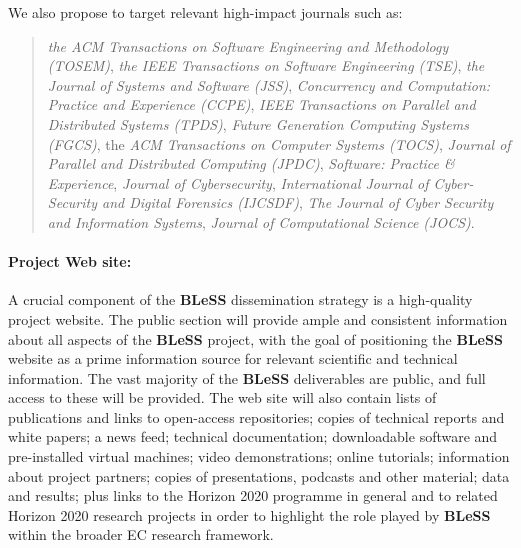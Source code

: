 \documentclass[a4paper,11pt]{article}
\newcommand{\project}[1]{\textbf{#1}\xspace}
\newcommand{\BLESS}{\project{BLeSS}}
\newcommand{\TheProject}{\BLESS}
\begin{document}
\noindent
We also propose to target relevant high-impact journals such as:
\begin{quote}
\emph{the ACM Transactions on Software Engineering and Methodology (TOSEM)}, 
\emph{the IEEE Transactions on Software Engineering (TSE)}, 
\emph{the Journal of Systems and Software (JSS)},
\emph{Concurrency and Computation: Practice and Experience (CCPE)},
\emph{IEEE Transactions on Parallel and Distributed Systems (TPDS)},
\emph{Future Generation Computing Systems (FGCS)},
the \emph{ACM Transactions on Computer Systems (TOCS)},
\emph{Journal of Parallel and Distributed Computing (JPDC)},
\emph{Software: Practice \& Experience}, 
\emph{Journal of Cybersecurity},
\emph{International Journal of Cyber-Security and Digital Forensics (IJCSDF)},
\emph{The Journal of Cyber Security and Information Systems},
\emph{Journal of Computational Science (JOCS)}.
\end{quote}

\paragraph{Project Web site:}  
A crucial component of the \TheProject{} dissemination strategy is a
high-quality project website. The public section will provide ample
and consistent information about all aspects of the \TheProject{}
project, with the goal of positioning the \TheProject{} website as a
prime information source for relevant scientific and technical
information.  The vast majority of the \TheProject{} deliverables are
public, and full access to these will be provided.  The web site will also contain lists of publications and links
to open-access repositories; copies of technical reports and white
papers; a news feed; technical documentation; downloadable software
and pre-installed virtual machines; video demonstrations; online
tutorials; information about project partners; copies of
presentations, podcasts and other material; data and results; plus
links to the Horizon 2020 programme in general and to related 
Horizon 2020 research projects in order to highlight the role played by \TheProject{} within the
broader EC research framework.
\end{document}
